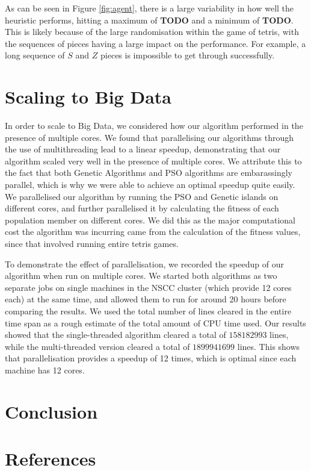 \documentclass{article}
\begin{document}
	As can be seen in Figure \ref{fig:agent}, there is a large variability in how
	well the heuristic performs, hitting a maximum of \textbf{TODO} and a minimum of \textbf{TODO}.
	This is likely because of the large randomisation within the game of tetris,
	with the sequences of pieces having a large impact on the performance. For example,
	a long sequence of $S$ and $Z$ pieces is impossible to get through successfully.

    \section{Scaling to Big Data}
	In order to scale to Big Data, we considered how our algorithm performed in the presence
	of multiple cores. We found that parallelising our algorithms through the use
	of multithreading lead to a linear speedup, demonstrating that our algorithm scaled very
	well in the presence of multiple cores. We attribute this to the fact that
	both Genetic Algorithms and PSO algorithms are embarassingly parallel, which
	is why we were able to achieve an optimal speedup quite easily.\\

	We parallelised our algorithm by running the PSO and Genetic islands on different cores,
	and further parallelised it by calculating the fitness of each population member on different cores.
	We did this as the major computational cost the algorithm was incurring came from
	the calculation of the fitness values, since that involved running entire tetris games.

	To demonstrate the effect of parallelisation, we recorded the speedup of our algorithm when run
	on multiple cores. We started both algorithms as two separate jobs on single machines
	in the NSCC cluster (which provide 12 cores each) at the same time, and allowed them to run for around 20
	hours before comparing the results. We used the total number of lines cleared
	in the entire time span as a rough estimate of the total amount of
	CPU time used. Our results showed that the single-threaded algorithm cleared
	a total of $158182993$ lines, while the multi-threaded version cleared a total
	of $1899941699$ lines. This shows that parallelisation provides a speedup of 12 times,
	which is optimal since each machine has 12 cores.

    \section{Conclusion}



    \section{References}
	
	
\end{document}
